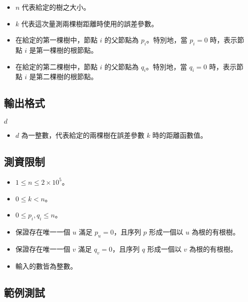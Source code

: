 \begin{itemize}
\tightlist
\item
  \(n\) 代表給定的樹之大小。
\item
  \(k\) 代表這次量測兩棵樹距離時使用的誤差參數。
\item
  在給定的第一棵樹中，節點 \(i\) 的父節點為 \(p_i\)。特別地，當
  \(p_i = 0\) 時，表示節點 \(i\) 是第一棵樹的根節點。
\item
  在給定的第二棵樹中，節點 \(i\) 的父節點為 \(q_i\)。特別地，當
  \(q_i = 0\) 時，表示節點 \(i\) 是第二棵樹的根節點。
\end{itemize}

\subsection{輸出格式}

\begin{format}
\f{
$d$
}
\end{format}

\begin{itemize}
\tightlist
\item
  \(d\) 為一整數，代表給定的兩棵樹在誤差參數 \(k\) 時的距離函數值。
\end{itemize}

\subsection{測資限制}

\begin{itemize}
\tightlist
\item
  \(1 \le n \le 2\times 10^5\)。
\item
  \(0 \le k < n\)。
\item
  \(0 \le p_i, q_i \le n\)。
\item
  保證存在唯一一個 \(u\) 滿足 \(p_u = 0\)，且序列 \(p\) 形成一個以 \(u\)
  為根的有根樹。
\item
  保證存在唯一一個 \(v\) 滿足 \(q_v = 0\)，且序列 \(q\) 形成一個以 \(v\)
  為根的有根樹。
\item
  輸入的數皆為整數。
\end{itemize}

\subsection{範例測試}

\begin{example}
%
%
%
%
\end{example}


